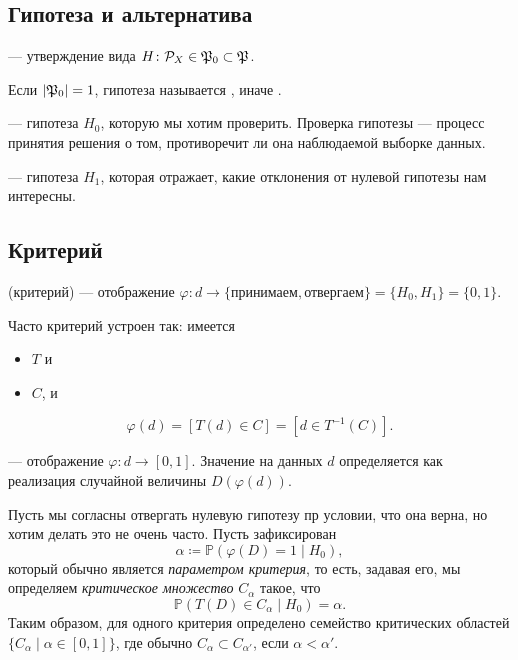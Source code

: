 \documentclass[11pt]{book}
\begin{document}
\subsection{Гипотеза и альтернатива}
\begin{definition}[]
	 --- утверждение вида $H\colon \mathcal{P}_X \in  \mathfrak{P}_0 \subset \mathfrak{P}$.

	Если $\lvert \mathfrak{P}_0 \rvert = 1$, гипотеза называется , иначе .

	 --- гипотеза $H_0$, которую мы хотим проверить. Проверка гипотезы --- процесс принятия решения о том, противоречит ли она наблюдаемой выборке данных.

	 --- гипотеза $H_1$, которая отражает, какие отклонения от нулевой гипотезы нам интересны.
\end{definition}
\subsection{Критерий}
\begin{definition}[]
	 (критерий) --- отображение $\varphi \colon d \to \{\text{принимаем}, \text{отвергаем}\} = \{H_0, H_1\} = \{0, 1\}$.
\end{definition}
Часто критерий устроен так: имеется
\vspace{-1.5em}
\begin{itemize}[noitemsep]
	\item {} $T$ и
	\item {} $C$, и
\end{itemize}
\vspace{-1.5em}
\[
\varphi(d) = [T(d) \in C] = [d \in T^{-1}(C)]
.\] 
\begin{definition}[]
	 --- отображение $\varphi\colon d \to [0, 1]$. Значение на данных $d$ определяется как реализация случайной величины $D(\varphi(d))$.
\end{definition}
Пусть мы согласны отвергать нулевую гипотезу пр условии, что она верна, но хотим делать это не очень часто. Пусть зафиксирован 
\[
	\alpha\coloneqq \mathbb{P} (\varphi(D) = 1 \mid H_0) 
,\] 
который обычно является \textit{параметром критерия}, то есть, задавая его, мы определяем \textit{критическое множество} $C_{\alpha}$ такое, что
\[
	\mathbb{P} (T(D) \in C_{\alpha} \mid H_0) = \alpha
.\] 
Таким образом, для одного критерия определено семейство критических областей $\{C_{\alpha} \mid \alpha \in  [0, 1]\}$, где обычно $C_{\alpha} \subset C_{\alpha'}$, если $\alpha < \alpha'$.
\end{document}
